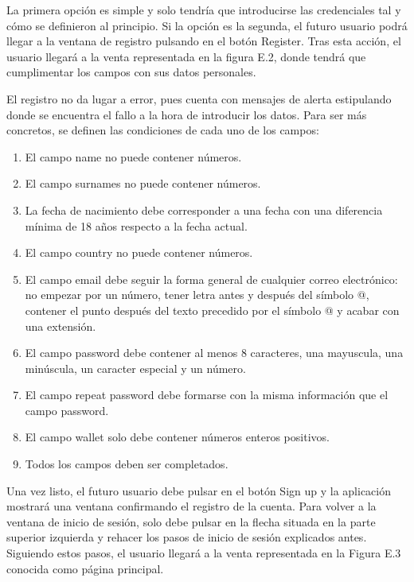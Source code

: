 	La primera opción es simple y solo tendría que introducirse las credenciales tal y cómo se definieron al principio. Si la opción es la segunda, el futuro usuario podrá llegar a la ventana de registro pulsando en el botón Register. Tras esta acción, el usuario llegará a la venta representada en la figura E.2, donde tendrá que cumplimentar los campos con sus datos personales.

	
	El registro no da lugar a error, pues cuenta con mensajes de alerta estipulando donde se encuentra el fallo a la hora de introducir los datos. Para ser más concretos, se definen las condiciones de cada uno de los campos:
	\begin{enumerate}
		\item El campo name no puede contener números.
		\item El campo surnames no puede contener números.
		\item La fecha de nacimiento debe corresponder a una fecha con una diferencia mínima de 18 años respecto a la fecha actual.
		\item El campo country no puede contener números.
		\item El campo email debe seguir la forma general de cualquier correo electrónico: no empezar por un número, tener letra antes y después del símbolo @, contener el punto después del texto precedido por el símbolo @ y acabar con una extensión.
		\item El campo password debe contener al menos 8 caracteres, una mayuscula, una minúscula, un caracter especial y un número.
		\item El campo repeat password debe formarse con la misma información que el campo password.
		\item El campo wallet solo debe contener números enteros positivos.
		\item Todos los campos deben ser completados.
	\end{enumerate}
	Una vez listo, el futuro usuario debe pulsar en el botón Sign up y la aplicación mostrará una ventana confirmando el registro de la cuenta. Para volver a la ventana de inicio de sesión, solo debe pulsar en la flecha situada en la parte superior izquierda y rehacer los pasos de inicio de sesión explicados antes. Siguiendo estos pasos, el usuario llegará a la venta representada en la Figura E.3 conocida como página principal.


